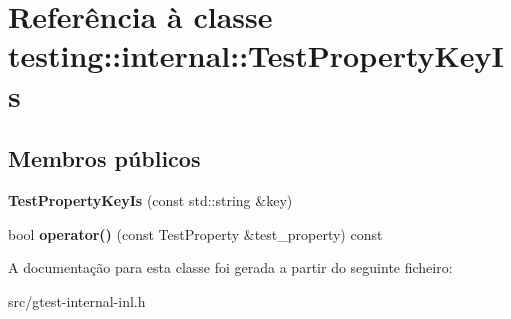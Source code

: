 \hypertarget{classtesting_1_1internal_1_1TestPropertyKeyIs}{\section{Referência à classe testing\-:\-:internal\-:\-:Test\-Property\-Key\-Is}
\label{classtesting_1_1internal_1_1TestPropertyKeyIs}
}
\subsection*{Membros públicos}
\begin{DoxyCompactItemize}
\item 
\hypertarget{classtesting_1_1internal_1_1TestPropertyKeyIs_a509ed1271caa1032e40c5d811b3da385}{{\bfseries Test\-Property\-Key\-Is} (const std\-::string \&key)}\label{classtesting_1_1internal_1_1TestPropertyKeyIs_a509ed1271caa1032e40c5d811b3da385}

\item 
\hypertarget{classtesting_1_1internal_1_1TestPropertyKeyIs_aed5dfb89159b3a071a8f3521fa1f8eb0}{bool {\bfseries operator()} (const Test\-Property \&test\-\_\-property) const }\label{classtesting_1_1internal_1_1TestPropertyKeyIs_aed5dfb89159b3a071a8f3521fa1f8eb0}

\end{DoxyCompactItemize}


A documentação para esta classe foi gerada a partir do seguinte ficheiro\-:\begin{DoxyCompactItemize}
\item 
src/gtest-\/internal-\/inl.\-h\end{DoxyCompactItemize}
